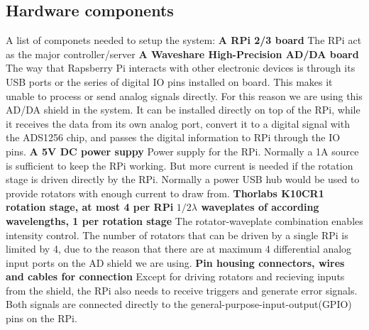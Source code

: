 \documentclass{article}
\begin{document}
\subsection{Hardware components}
A list of componets needed to setup the system:\newline\newline
\textbf{A RPi 2/3 board}\newline
The RPi act as the major controller/server\newline\newline
\textbf{A Waveshare High-Precision AD/DA board}\newline
The way that Rapsberry Pi interacts with other electronic devices is through its USB ports or the series of digital IO pins installed on board. This makes it unable to process or send analog signals directly. For this reason we are using this AD/DA shield in the system. It can be installed directly on top of the RPi, while it receives the data from its own analog port, convert it to a digital signal with the ADS1256 chip, and passes the digital information to RPi through the IO pins.  \newline\newline
\textbf{A 5V DC power suppy}\newline
Power supply for the RPi. Normally a 1A source is sufficient to keep the RPi working. But more current is needed if the rotation stage is driven directly by the RPi. Normally a power USB hub would be used to provide rotators with enough current to draw from.  \newline\newline
\textbf{Thorlabs K10CR1 rotation stage, at most 4 per RPi}\newline
\textbf{$1/2\lambda$ waveplates of according wavelengths, 1 per rotation stage}\newline
The rotator-waveplate combination enables intensity control. The number of rotators that can be driven by a single RPi is limited by 4, due to the reason that there are at maximum 4 differential analog input ports on the AD shield we are using. \newline\newline
\textbf{Pin housing connectors, wires and cables for connection}\newline
Except for driving rotators and recieving inputs from the shield, the RPi also needs to receive triggers and generate error signals. Both signals are connected directly to the general-purpose-input-output(GPIO) pins on the RPi.  \newline
\end{document}
